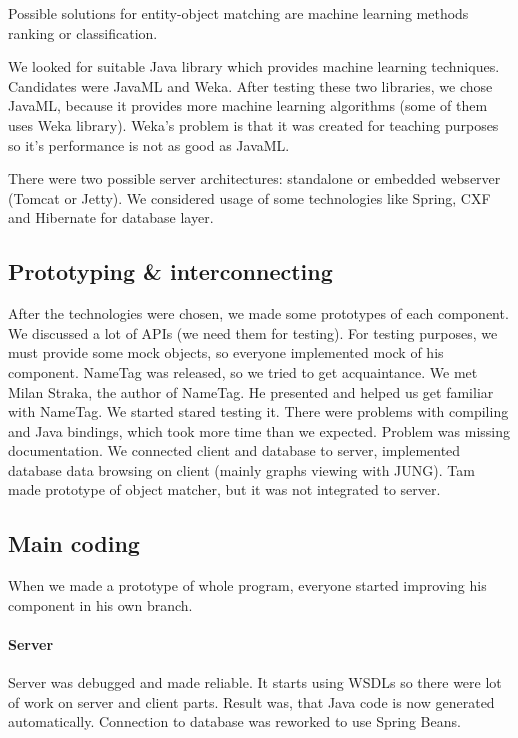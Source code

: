 Possible solutions for entity-object matching are machine learning  methods
ranking or classification.

We looked for suitable Java library which provides machine learning techniques.
Candidates were JavaML and Weka. After testing these two libraries, we chose
JavaML, because it provides more machine learning algorithms (some of them uses
Weka library). Weka's problem is that it was created for teaching purposes so
it's performance is not as good as JavaML.

There were two possible server architectures: standalone or embedded webserver
(Tomcat or Jetty). We considered usage of some technologies like Spring, CXF and
Hibernate for database layer.

\subsection{Prototyping \& interconnecting}
After the technologies were chosen, we made some prototypes of each component. We
discussed a lot of APIs (we need them for testing). For testing purposes, we must
provide some mock objects, so everyone implemented mock of his component.
NameTag was released, so we tried to get acquaintance. We met Milan Straka, the author of NameTag.
He presented and helped us get familiar with NameTag. We started stared testing it.
There were problems with compiling and Java bindings, which took more time than we expected. Problem was missing documentation.
We connected client and database to server, implemented database data browsing on client (mainly graphs viewing with JUNG).
Tam made prototype of object matcher, but it was not integrated to server.

\subsection{Main coding}
When we made a prototype of whole program, everyone started improving his component in his own branch.
\paragraph{Server} Server was debugged and made reliable. It starts using WSDLs so there were lot of work on server and client parts. Result was, that Java code is now generated automatically. Connection to database was reworked to use Spring Beans.
